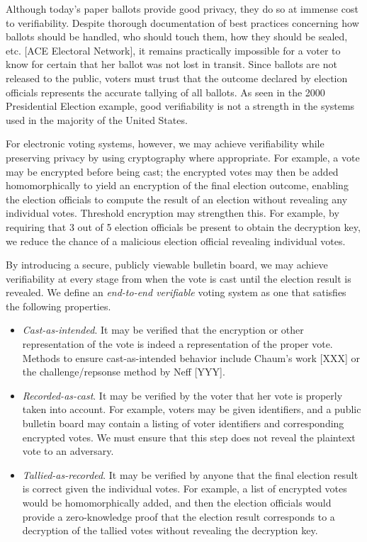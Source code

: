 Although today's paper ballots provide good privacy, they do so at immense cost to verifiability. Despite thorough documentation of best practices concerning how ballots should be handled, who should touch them, how they should be sealed, etc. [ACE Electoral Network], it remains practically impossible for a voter to know for certain that her ballot was not lost in transit. Since ballots are not released to the public, voters must trust that the outcome declared by election officials represents the accurate tallying of all ballots. As seen in the 2000 Presidential Election example, good verifiability is not a strength in the systems used in the majority of the United States.

For electronic voting systems, however, we may achieve verifiability while preserving privacy by using cryptography where appropriate. For example, a vote may be encrypted before being cast; the encrypted votes may then be added homomorphically to yield an encryption of the final election outcome, enabling the election officials to compute the result of an election without revealing any individual votes. Threshold encryption may strengthen this. For example, by requiring that 3 out of 5 election officials be present to obtain the decryption key, we reduce the chance of a malicious election official revealing individual votes.

By introducing a secure, publicly viewable bulletin board, we may achieve verifiability at every stage from when the vote is cast until the election result is revealed. We define an \emph{end-to-end verifiable} voting system as one that satisfies the following properties.

\begin{itemize}
\item \emph{Cast-as-intended}. It may be verified that the encryption or other representation of the vote is indeed a representation of the proper vote. Methods to ensure cast-as-intended behavior include Chaum's work [XXX] or the challenge/repsonse method by Neff [YYY].
\item \emph{Recorded-as-cast}. It may be verified by the voter that her vote is properly taken into account. For example, voters may be given identifiers, and a public bulletin board may contain a listing of voter identifiers and corresponding encrypted votes. We must ensure that this step does not reveal the plaintext vote to an adversary.
\item \emph{Tallied-as-recorded}. It may be verified by anyone that the final election result is correct given the individual votes. For example, a list of encrypted votes would be homomorphically added, and then the election officials would provide a zero-knowledge proof that the election result corresponds to a decryption of the tallied votes without revealing the decryption key.
\end{itemize}

